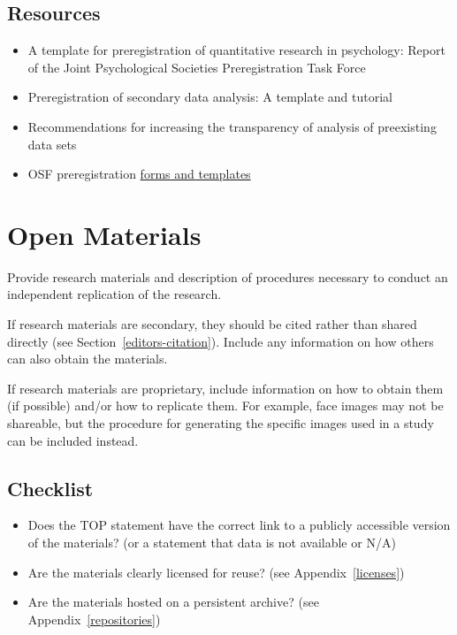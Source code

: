 \documentclass[
  oneside]{book}
\providecommand{\tightlist}{%
  \setlength{\itemsep}{0pt}\setlength{\parskip}{0pt}}
\begin{document}
\hypertarget{resources-2}{%
\section{Resources}\label{resources-2}}

\begin{itemize}
\tightlist
\item
  A template for preregistration of quantitative research in psychology: Report of the Joint Psychological Societies Preregistration Task Force \citep{bosnjak2021template}
\item
  Preregistration of secondary data analysis: A template and tutorial \citep{van2021preregistration}
\item
  Recommendations for increasing the transparency of analysis of preexisting data sets \citep{weston2019recommendations}
\item
  OSF preregistration \href{https://osf.io/zab38/wiki/home/}{forms and templates}
\end{itemize}

\hypertarget{editors-open-materials}{%
\chapter{Open Materials}\label{editors-open-materials}}

Provide research materials and description of procedures necessary to conduct an independent replication of the research.

If research materials are secondary, they should be cited rather than shared directly (see Section~\ref{editors-citation}). Include any information on how others can also obtain the materials.

If research materials are proprietary, include information on how to obtain them (if possible) and/or how to replicate them. For example, face images may not be shareable, but the procedure for generating the specific images used in a study can be included instead.

\hypertarget{checklist-1}{%
\section{Checklist}\label{checklist-1}}

\begin{itemize}
\tightlist
\item
  Does the TOP statement have the correct link to a publicly accessible version of the materials? (or a statement that data is not available or N/A)
\item
  Are the materials clearly licensed for reuse? (see Appendix~\ref{licenses})
\item
  Are the materials hosted on a persistent archive? (see Appendix~\ref{repositories})
\end{itemize}
\end{document}
